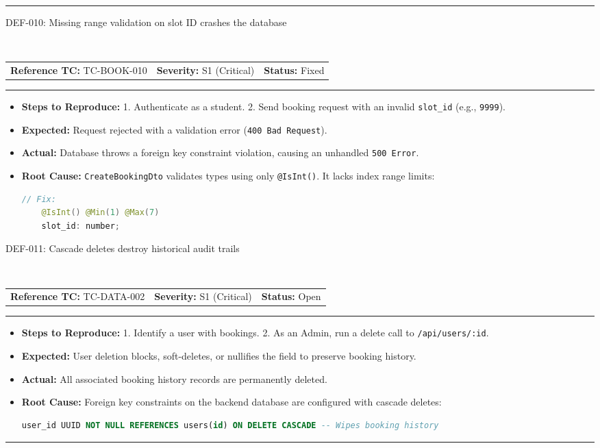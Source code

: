 \documentclass[11pt,a4paper]{article}
\makeatletter
\newcommand{\defectheader}[5]{%
    \needspace{6\baselineskip}
    \noindent\colorbox{primaryblue}{\parbox{\dimexpr\textwidth-2\fboxsep\relax}{
        \color{white}\bfseries\large\strut #1: #2
    }}
    \nopagebreak\\
    \noindent\begin{tabularx}{\textwidth}{@{}X X X@{}}
        \textbf{Reference TC:} #3 & \textbf{Severity:} #4 & \textbf{Status:} #5 \\
    \end{tabularx}
    \nopagebreak\vspace{0.1cm}
    \nopagebreak\hrule\vspace{0.2cm}
}
\makeatother
\begin{document}
\vspace{0.4cm}\hrule\vspace{0.4cm}

\defectheader{DEF-010}{Missing range validation on slot ID crashes the database}{TC-BOOK-010}{S1 (Critical)}{Fixed}
\begin{itemize}[noitemsep,topsep=1pt,leftmargin=0.5cm]
    \item \textbf{Steps to Reproduce:} 
    1. Authenticate as a student. 2. Send booking request with an invalid \texttt{slot\_id} (e.g., \texttt{9999}).
    \item \textbf{Expected:} Request rejected with a validation error (\texttt{400 Bad Request}).
    \item \textbf{Actual:} Database throws a foreign key constraint violation, causing an unhandled \texttt{500 Error}.
    \item \textbf{Root Cause:} \texttt{CreateBookingDto} validates types using only \texttt{@IsInt()}. It lacks index range limits:
    \begin{lstlisting}[language=Java]
    // Fix:
    @IsInt() @Min(1) @Max(7)
    slot_id: number;
    \end{lstlisting}
\end{itemize}

\newpage

\defectheader{DEF-011}{Cascade deletes destroy historical audit trails}{TC-DATA-002}{S1 (Critical)}{Open}
\begin{itemize}[noitemsep,topsep=1pt,leftmargin=0.5cm]
    \item \textbf{Steps to Reproduce:} 
    1. Identify a user with bookings. 2. As an Admin, run a delete call to \texttt{/api/users/:id}.
    \item \textbf{Expected:} User deletion blocks, soft-deletes, or nullifies the field to preserve booking history.
    \item \textbf{Actual:} All associated booking history records are permanently deleted.
    \item \textbf{Root Cause:} Foreign key constraints on the backend database are configured with cascade deletes:
    \begin{lstlisting}[language=SQL]
    user_id UUID NOT NULL REFERENCES users(id) ON DELETE CASCADE -- Wipes booking history
    \end{lstlisting}
\end{itemize}

\vspace{0.4cm}\hrule\vspace{0.4cm}
\end{document}
